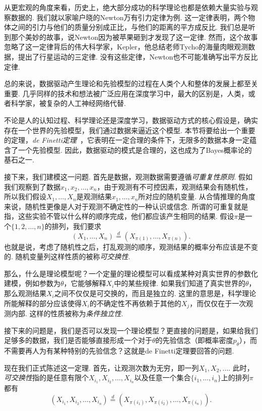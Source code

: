 从更宏观的角度来看，历史上，绝大部分成功的科学理论也都是依赖大量实验与观察数据的. 我们就以家喻户晓的Newton万有引力定律为例. 这一定律表明，两个物体之间的引力与他们的质量分别成正比，与他们的距离的平方成反比. 我们总是听到那个美妙的故事，说Newton因为被苹果砸到才发现了这一定律. 然而，这个故事忽略了这一定律背后的伟大科学家，Kepler，他总结老师Tycho的海量肉眼观测数据，提出了行星运动的三定律. 没有这些定律，Newton也不可能准确写出平方反比定律. 

总的来说，数据驱动产生理论和先验模型的过程在人类个人和整体的发展上都至关重要. 几乎同样的技术和想法被广泛应用在深度学习中，最大的区别是，人类，或者科学家，被复杂的人工神经网络代替. 

不论是人的认知过程、科学理论还是深度学习，数据驱动方式的核心假设是，确实存在一个世界的先验模型，我们通过数据来逼近这个模型. 本节将要给出一个重要的定理，\textit{de Finetti定理}~\cite{diaconisFiniteExchangeableSequences1980,kernsDefinettisTheoremAbstract2006,durrettProbabilityTheoryExamples2019}，它表明在一定合理的条件下，无限多的数据本身一定蕴含了一个先验模型. 因此，数据驱动的模式是合理的，这也成为了Bayes概率论的基石之一.

接下来，我们建模这一问题. 首先是数据，观测数据需要遵循\textit{可重复性原则}. 假如我们观察到了数据$x_1,x_2,\dots,x_n$，由于观测有不可控因素，观测结果会有随机性，所以我们假设$X_1,\dots,X_n$是观测结果$x_1,\dots,x_n$所对应的随机变量. 从合情推理的角度来说，随机性更像是人对于观测不确定性的一种认识或信念. 所谓的可重复就是指，这些实验不管以什么样的顺序完成，他们都应该产生相同的结果. 假设$\pi$是一个$\{1,2,\dots,n\}$的排列，我们要求
\[
    (X_1,\dots,X_n)\stackrel{d}{=}(X_{\pi(1)},\dots,X_{\pi(n)}).
\]
也就是说，考虑了随机性之后，打乱观测的顺序，观测结果的概率分布应该是不变的. 随机变量列这样性质的被称\textit{可交换性}. 

那么，什么是理论模型呢？一个定量的理论模型可以看成某种对真实世界的参数化建模，例如参数为$\theta$，它能够解释$X_i$中的某些规律. 如果我们知道了真实世界的$\theta$，那么观测结果$X_i$之间不仅仅是可交换的，而且是独立的. 这里的意思是，科学理论所能解释的部分应该使得$X_i$的不确定性不再依赖于其他的$X_j$，而仅仅在于一次观测内部. 这样的性质被称为\textit{条件独立性}. 

接下来的问题是，我们是否可以发现一个理论模型？更直接的问题是，如果给我们足够多的数据，我们是否能够直接形成一个对于$\theta$的先验信念（即概率密度$p_\theta$），而不需要再人为有某种特别的先验信念？这就是de Finetti定理要回答的问题.

现在我们正式陈述这一定理. 首先，让观测次数为无穷，即一列$X_1,X_2,\dots$. 此时，\textit{可交换性}指的是任意有限个$X_{i_1},X_{i_2},\dots,X_{i_n}$以及任意一个集合$\{i_1,\dots,i_n\}$上的排列$\pi$都有
\[
    (X_{i_1},X_{i_2},\dots,X_{i_n})\stackrel{d}{=}(X_{\pi(i_1)},X_{\pi(i_2)},\dots,X_{\pi(i_n)}).
\]


